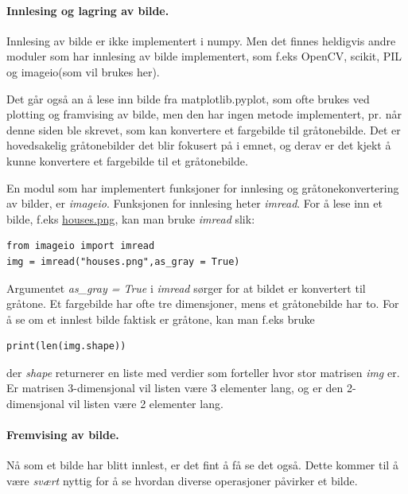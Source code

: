 \documentclass[%
oneside,                 %
final,                   %
10pt]{article}
\begin{document}
\paragraph{Innlesing og lagring av bilde.}
Innlesing av bilde er ikke implementert i numpy. Men det finnes heldigvis andre moduler som har innlesing av bilde implementert, som f.eks OpenCV, scikit, PIL og imageio(som vil brukes her).

Det går også an å lese inn bilde fra matplotlib.pyplot, som ofte brukes ved plotting og framvising av bilde, men den har ingen metode implementert, pr. når denne siden ble skrevet, som kan konvertere et fargebilde til gråtonebilde.
Det er hovedsakelig gråtonebilder det blir fokusert på i emnet, og derav er det kjekt å kunne konvertere et fargebilde til et gråtonebilde.



\vspace{3mm}


En modul som har implementert funksjoner for innlesing og gråtonekonvertering av bilder, er \emph{imageio}.
Funksjonen for innlesing heter \emph{imread}. For å lese inn et bilde, f.eks \href{{https://github.com/krisbhei/INF2310/raw/master/Programmering/Python/houses.png}}{houses.png}, kan man bruke \emph{imread} slik:
\begin{verbatim}
from imageio import imread
img = imread("houses.png",as_gray = True)
\end{verbatim}

Argumentet \emph{as\_gray = True} i \emph{imread} sørger for at bildet er konvertert til gråtone. Et fargebilde har ofte tre dimensjoner, mens et gråtonebilde har to.
For å se om et innlest bilde faktisk er gråtone, kan man f.eks bruke
\begin{verbatim}
print(len(img.shape))
\end{verbatim}
der \emph{shape} returnerer en liste med verdier som forteller hvor stor matrisen \emph{img} er. Er matrisen 3-dimensjonal vil listen være 3 elementer lang, og er den 2-dimensjonal vil listen være 2 elementer lang.

\paragraph{Fremvising av bilde.}
Nå som et bilde har blitt innlest, er det fint å få se det også. Dette kommer til å være \emph{svært} nyttig for å se hvordan diverse operasjoner påvirker et bilde.
\end{document}
